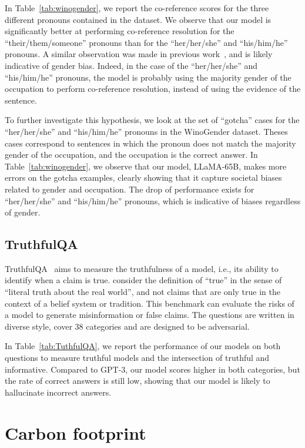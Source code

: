 In Table~\ref{tab:winogender}, we report the co-reference scores for the three different pronouns contained in the dataset. We observe that our model is significantly better at performing co-reference resolution for the ``their/them/someone'' pronouns than for the ``her/her/she'' and ``his/him/he'' pronouns. A similar observation was made in previous work~\cite{rae2021goepher,hoffmann2022chinchilla}, and is likely indicative of gender bias. Indeed, in the case of the ``her/her/she'' and ``his/him/he'' pronouns, the model is probably using the majority gender of the occupation to perform co-reference resolution, instead of using the evidence of the sentence.

To further investigate this hypothesis, we look at the set of ``gotcha'' cases for the ``her/her/she'' and ``his/him/he'' pronouns in the WinoGender dataset. Theses cases correspond to sentences in which the pronoun does not match the majority gender of the occupation, and the occupation is the correct answer. In Table~\ref{tab:winogender}, we observe that our model, LLaMA-65B, makes more errors on the gotcha examples, clearly showing that it capture societal biases related to gender and occupation. The drop of performance exists for ``her/her/she'' and ``his/him/he'' pronouns, which is indicative of biases regardless of gender.

\subsection{TruthfulQA}

TruthfulQA~\citep{lin2021truthfulqa} aims to measure the truthfulness of a model, i.e., its ability to identify when a claim is true.
\citet{lin2021truthfulqa} consider the definition of ``true'' in the sense of ``literal truth about the real world'', and not claims that are only true in the context of a belief system or tradition. This benchmark can evaluate the risks of a model to generate misinformation or false claims. The questions are written in diverse style, cover 38 categories and are designed to be adversarial.

In Table~\ref{tab:TuthfulQA}, we report the performance of our models on both questions to measure truthful models and the intersection of truthful and informative. Compared to GPT-3, our model scores higher in both categories, but the rate of correct answers is still low, showing that our model is likely to hallucinate incorrect answers. 

\section{Carbon footprint}


